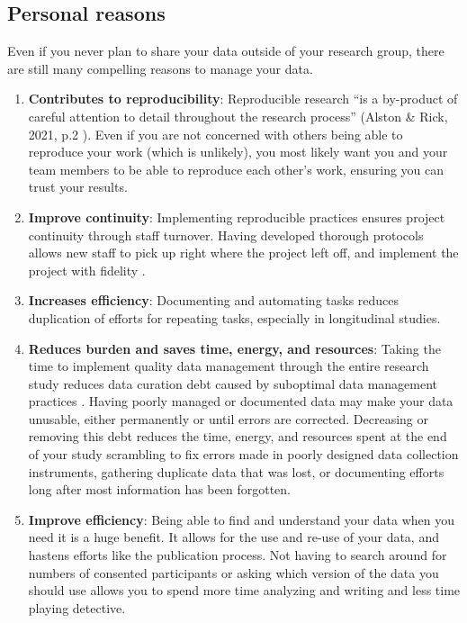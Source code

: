 \documentclass[
]{book}
\begin{document}
\hypertarget{personal-reasons}{%
\subsection{Personal reasons}\label{personal-reasons}}

Even if you never plan to share your data outside of your research group, there are still many compelling reasons to manage your data.

\begin{enumerate}
\def\labelenumi{\arabic{enumi}.}
\item
  \textbf{Contributes to reproducibility}: Reproducible research ``is a by-product of careful attention to detail throughout the research process'' (Alston \& Rick, 2021, p.2 \autocite{alston_beginners_2021}). Even if you are not concerned with others being able to reproduce your work (which is unlikely), you most likely want you and your team members to be able to reproduce each other's work, ensuring you can trust your results.
\item
  \textbf{Improve continuity}: Implementing reproducible practices ensures project continuity through staff turnover. Having developed thorough protocols allows new staff to pick up right where the project left off, and implement the project with fidelity \autocite{borghi_data_2021,cowles_research_nodate}.
\item
  \textbf{Increases efficiency}: Documenting and automating tasks reduces duplication of efforts for repeating tasks, especially in longitudinal studies.
\item
  \textbf{Reduces burden and saves time, energy, and resources}: Taking the time to implement quality data management through the entire research study reduces data curation debt caused by suboptimal data management practices \autocite{butters_recognizing_2020}. Having poorly managed or documented data may make your data unusable, either permanently or until errors are corrected. Decreasing or removing this debt reduces the time, energy, and resources spent at the end of your study scrambling to fix errors made in poorly designed data collection instruments, gathering duplicate data that was lost, or documenting efforts long after most information has been forgotten.
\item
  \textbf{Improve efficiency}: Being able to find and understand your data when you need it is a huge benefit. It allows for the use and re-use of your data, and hastens efforts like the publication process. Not having to search around for numbers of consented participants or asking which version of the data you should use allows you to spend more time analyzing and writing and less time playing detective.

\end{enumerate}
\end{document}
